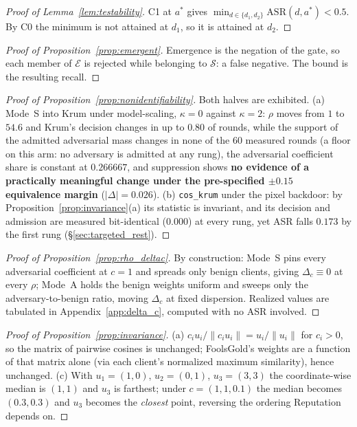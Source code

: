 \documentclass{article}
\begin{document}
\begin{proof}[Proof of Lemma~\ref{lem:testability}]
C1 at $a^*$ gives $\min_{d \in \{d_1,d_2\}} \mathrm{ASR}(d,a^*) < 0.5$. By C0 the minimum is not attained at $d_1$, so it is attained at $d_2$.
\end{proof}

\begin{proof}[Proof of Proposition~\ref{prop:emergent}]
Emergence is the negation of the gate, so each member of $\mathcal{E}$ is rejected while belonging to $\mathcal{S}$: a false negative. The bound is the resulting recall.
\end{proof}

\begin{proof}[Proof of Proposition~\ref{prop:nonidentifiability}]
Both halves are exhibited. (a) Mode~S into Krum under model-scaling, $\kappa{=}0$ against $\kappa{=}2$: $\rho$ moves from $1$ to $54.6$ and Krum's decision changes in up to $0.80$ of rounds, while the support of the admitted adversarial mass changes in none of the $60$ measured rounds (a floor on this arm: no adversary is admitted at any rung), the adversarial coefficient share is constant at $0.266667$, and suppression shows \textbf{no evidence of a practically meaningful change under the pre-specified $\pm0.15$ equivalence margin} ($|\Delta|{=}0.026$). (b) \texttt{cos\_krum} under the pixel backdoor: by Proposition~\ref{prop:invariance}(a) its statistic is invariant, and its decision and admission are measured bit-identical ($0.000$) at every rung, yet ASR falls $0.173$ by the first rung (\S\ref{sec:targeted_rest}).
\end{proof}

\begin{proof}[Proof of Proposition~\ref{prop:rho_deltac}]
By construction: Mode~S pins every adversarial coefficient at $c{=}1$ and spreads only benign clients, giving $\Delta_c \equiv 0$ at every $\rho$; Mode~A holds the benign weights uniform and sweeps only the adversary-to-benign ratio, moving $\Delta_c$ at fixed dispersion. Realized values are tabulated in Appendix~\ref{app:delta_c}, computed with no ASR involved.
\end{proof}

\begin{proof}[Proof of Proposition~\ref{prop:invariance}]
(a) $c_i u_i / \|c_i u_i\| = u_i/\|u_i\|$ for $c_i > 0$, so the matrix of pairwise cosines is unchanged; FoolsGold's weights are a function of that matrix alone (via each client's normalized maximum similarity), hence unchanged. (c) With $u_1{=}(1,0)$, $u_2{=}(0,1)$, $u_3{=}(3,3)$ the coordinate-wise median is $(1,1)$ and $u_3$ is farthest; under $c = (1,1,0.1)$ the median becomes $(0.3,0.3)$ and $u_3$ becomes the \emph{closest} point, reversing the ordering Reputation depends on.
\end{proof}
\end{document}

